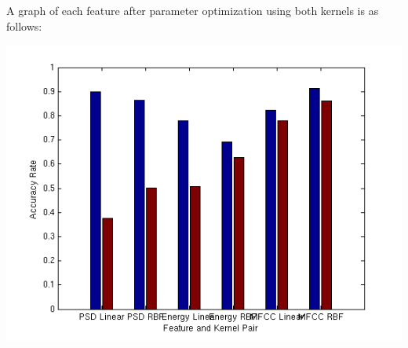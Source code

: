\documentclass[twoside]{article}
\begin{document}
A graph of each feature after parameter optimization using both kernels is as follows:\\
\begin{center}
\includegraphics[scale=0.9]{accuracy_rates.png}
\end{center}
\end{document}
